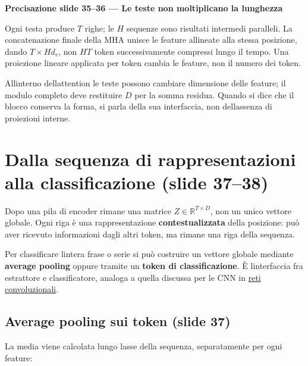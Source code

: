 \documentclass[11pt,a4paper,oneside,openany]{book}
\renewenvironment{quote}{\list{}{\leftmargin=1em\rightmargin=0pt}\item\relax}{\endlist}
\begin{document}
\begin{quote}
\textbf{Precisazione slide 35--36 --- Le teste non moltiplicano la lunghezza}
\end{quote}

\begin{quote}
Ogni testa produce \(T\) righe; le \(H\) sequenze sono risultati intermedi paralleli. La concatenazione finale della MHA unisce le feature allineate alla stessa posizione, dando \(T\times Hd_v\), non \(HT\) token successivamente compressi lungo il tempo. Una proiezione lineare applicata per token cambia le feature, non il numero dei token.
\end{quote}

All\textquotesingle interno dell\textquotesingle attention le teste possono cambiare dimensione delle feature; il modulo completo deve restituire \(D\) per la somma residua. Quando si dice che il blocco conserva la forma, si parla della sua interfaccia, non dell\textquotesingle assenza di proiezioni interne.

\section{Dalla sequenza di rappresentazioni alla classificazione (slide 37--38)}\label{f04-r766}

Dopo una pila di encoder rimane una matrice \(Z\in\mathbb R^{T\times D}\), non un unico vettore globale. Ogni riga è una rappresentazione \textbf{contestualizzata} della posizione: può aver ricevuto informazioni dagli altri token, ma rimane una riga della sequenza.

Per classificare l\textquotesingle intera frase o serie si può costruire un vettore globale mediante \textbf{average pooling} oppure tramite un \textbf{token di classificazione}. È l\textquotesingle interfaccia fra estrattore e classificatore, analoga a quella discussa per le CNN in \hyperref[fonte02]{reti convoluzionali}.

\subsection{Average pooling sui token (slide 37)}\label{f04-r772}

La media viene calcolata lungo l\textquotesingle asse della sequenza, separatamente per ogni feature:
\end{document}
